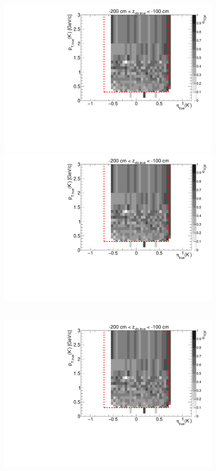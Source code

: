 \begin{figure}[hb]
{  \includegraphics[width=\linewidth,page=7]{graphics/eff/Eff2D_TOF_kaon_Minus.pdf}\\
  \includegraphics[width=\linewidth,page=9]{graphics/eff/Eff2D_TOF_kaon_Minus.pdf}
}~
\parbox{0.495\textwidth}{
  \centering
  \includegraphics[width=\linewidth,page=4]{graphics/eff/Eff2D_TOF_kaon_Minus.pdf}\\
}
\end{figure}
